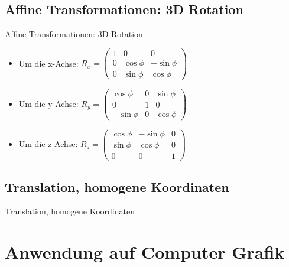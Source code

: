 \documentclass[10pt,aspectratio=169]{beamer}
\begin{document}
  \subsection{Affine Transformationen: 3D Rotation}
  \begin{frame}{Affine Transformationen: 3D Rotation}
    \begin{center}
    \begin{itemize}
      \item Um die x-Achse: \hspace{0.1cm}
      $R_x = \begin{pmatrix}
        1 & 0 & 0\\
        0 & \cos\phi & -\sin\phi\\
        0 & \sin\phi & \cos\phi
      \end{pmatrix}$\vspace{0.5cm}
      \item Um die y-Achse: \hspace{0.1cm}
      $R_y = \begin{pmatrix}
        \cos\phi & 0 & \sin\phi\\
        0 & 1 & 0\\
        -\sin\phi & 0 & \cos\phi
      \end{pmatrix}$\vspace{0.5cm}
      \item Um die z-Achse: \hspace{0.1cm}
      $R_z = \begin{pmatrix}
        \cos\phi & -\sin\phi & 0\\
        \sin\phi & \cos\phi & 0\\
        0 & 0 & 1
      \end{pmatrix}$
    \end{itemize}
  \end{center}
  \end{frame}

  \subsection{Translation, homogene Koordinaten}
  \begin{frame}{Translation, homogene Koordinaten}
  \end{frame}

  \section{Anwendung auf Computer Grafik}
\end{document}
